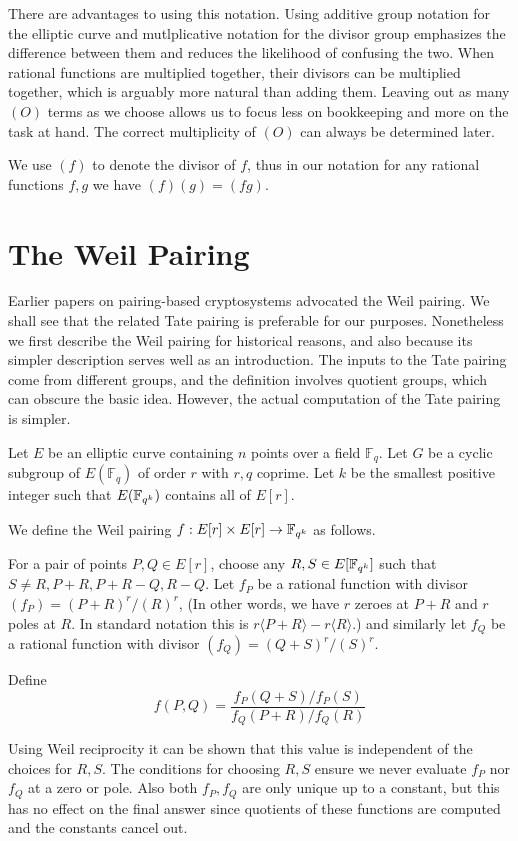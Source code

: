 There are advantages to using this notation. Using additive group
notation for the elliptic curve and mutlplicative notation for the divisor
group emphasizes the difference between them and reduces the likelihood of
confusing the two. When rational functions are multiplied together,
their divisors can be multiplied together, which is arguably
more natural than adding them.
Leaving out as many $(O)$ terms as we choose allows us to focus less on
bookkeeping and more on the task at hand.
The correct multiplicity of $(O)$ can always be determined later.

We use
$(f)$ to denote the divisor of $f$, thus in our notation
for any rational functions $f, g$ we have $(f)(g) = (f g)$.

\section {The Weil Pairing}

Earlier papers on pairing-based cryptosystems advocated the Weil pairing.
We shall see that the related Tate pairing is preferable for our purposes.
Nonetheless we first describe the Weil pairing
for historical reasons, and also because its simpler description
serves well as an introduction. The inputs to the Tate pairing come
from different groups, and the definition involves quotient groups,
which can obscure the basic idea. However, the actual computation
of the Tate pairing is simpler.

Let $E$ be an elliptic curve containing $n$ points over a field $\mathbb{F}_q$.
Let $G$ be a cyclic subgroup of $E(\mathbb{F}_q)$ of order $r$ with $r, q$
coprime. Let $k$ be the smallest positive integer such that $E(\mathbb{F}_{q^k})$
contains all of $E[r]$.

We define the Weil pairing
$f:E[r] \times E[r] \rightarrow \mathbb{F}_{q^k}$ as follows.

For a pair of points $P, Q \in E[r]$,
choose any $R, S \in E[\mathbb{F}_{q^k}]$ such that $S \ne R, P+R, P+R - Q, R-Q$.
Let $f_P$ be a rational function with divisor $(f_P) = (P+R)^r /(R)^r$,
(In other words, we have $r$ zeroes at $P+R$ and $r$ poles at $R$.
In standard notation this is $r\langle P+R\rangle  - r\langle R\rangle$.)
and similarly let $f_Q$ be a rational function with divisor
$(f_Q) = (Q+S)^r/(S)^r$.

Define
\[ f(P,Q) = \frac{f_P(Q+S)/f_P(S)}{f_Q(P+R)/f_Q(R)} \]

Using Weil reciprocity it can be shown that this value is independent
of the choices for $R, S$. The conditions for choosing $R, S$ ensure
we never evaluate $f_P$ nor $f_Q$ at a zero or pole.
Also both $f_P, f_Q$ are only unique up to a constant,
but this has no effect on the final answer since quotients
of these functions are computed and the constants cancel out.

